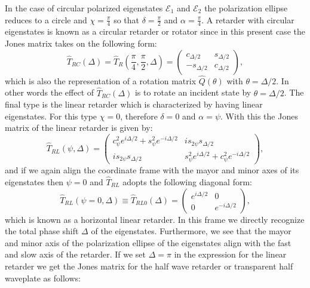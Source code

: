 In the case of circular polarized eigenstates $\bm{\mathcal{E}}_1$ and $\bm{\mathcal{E}}_2$ the polarization ellipse reduces to a circle and $\chi=\frac{\pi}{4}$ so that $\delta=\frac{\pi}{2}$ and $\alpha=\frac{\pi}{4}$. A retarder with circular eigenstates is known as a circular retarder or rotator since in this present case the Jones matrix takes on the following form:
\begin{equation}
    \hat{T}_{RC}(\Delta)=\hat{T}_R\left(\frac{\pi}{4}, \frac{\pi}{2}, \Delta\right) = 
    \begin{pmatrix} 
    c_{\Delta/2} & s_{\Delta/2} \\
    -s_{\Delta/2} & c_{\Delta/2}
    \end{pmatrix},
\end{equation}
which is also the representation of a rotation matrix $\hat{Q}(\theta)$ with $\theta=\Delta/2$. In other words the effect of $\hat{T}_{RC}(\Delta)$ is to rotate an incident state by $\theta=\Delta/2$. The final type is the linear retarder which is characterized by having linear eigenstates. For this type $\chi=0$, therefore $\delta=0$ and $\alpha=\psi$. With this the Jones matrix of the linear retarder is given by:
\begin{equation}
    \hat{T}_{RL}\left(\psi, \Delta\right) = 
    \begin{pmatrix} 
    c^2_{\psi} e^{i\Delta /2} + s^2_{\psi} e^{-i\Delta /2} & is_{2\psi} s_{\Delta/2} \\
    is_{2\psi} s_{\Delta/2} & s^2_{\psi} e^{i\Delta /2} + c^2_{\psi} e^{-i\Delta /2}
    \end{pmatrix},
\end{equation}
and if we again align the coordinate frame with the mayor and minor axes of its eigenstates then $\psi=0$ and $\hat{T}_{RL}$ adopts the following diagonal form:
\begin{equation}
    \hat{T}_{RL}\left(\psi=0, \Delta\right) \equiv \hat{T}_{RL0}\left(\Delta\right) = 
    \begin{pmatrix} 
    e^{i\Delta /2} & 0 \\
    0 & e^{-i\Delta /2}
    \end{pmatrix},
\end{equation}
which is known as a horizontal linear retarder. In this frame we directly recognize the total phase shift $\Delta$ of the eigenstates. Furthermore, we see that the mayor and minor axis of the polarization ellipse of the eigenstates align with the fast and slow axis of the retarder. If we set $\Delta=\pi$ in the expression for the linear retarder we get the Jones matrix for the half wave retarder or transparent half waveplate as follows:
